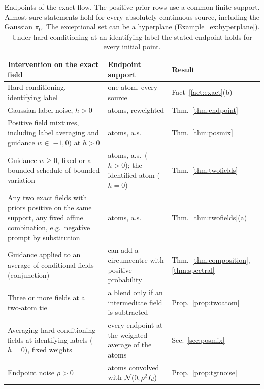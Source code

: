 \documentclass{article} %
\theoremstyle{plain}
\theoremstyle{definition}
\theoremstyle{remark}
\begin{document}
\begin{table}[t]
\centering\footnotesize
\begin{tabular}{@{}p{}p{}p{}@{}}
\toprule
Intervention on the exact field & Endpoint support & Result\\
\midrule
Hard conditioning, identifying label & one atom, every source & Fact~\ref{fact:exact}(b)\\
Gaussian label noise, $h>0$ & atoms, reweighted & Thm.~\ref{thm:endpoint}\\
Positive field mixtures, including label averaging and guidance $w\in[-1,0)$ at $h>0$ & atoms, a.s. & Thm.~\ref{thm:posmix}\\
Guidance $w\ge0$, fixed or a bounded schedule of bounded variation & atoms, a.s.\ ($h>0$); the identified atom ($h=0$) & Thm.~\ref{thm:twofields}\\
Any two exact fields with priors positive on the same support, any fixed affine combination, e.g.\ negative prompt by substitution & atoms, a.s. & Thm.~\ref{thm:twofields}(a)\\
Guidance applied to an average of conditional fields (conjunction) & can add a circumcentre with positive probability & Thm.~\ref{thm:composition}, \ref{thm:spectral}\\
Three or more fields at a two-atom tie & a blend only if an intermediate field is subtracted & Prop.~\ref{prop:twoatom}\\
Averaging hard-conditioning fields at identifying labels ($h=0$), fixed weights & every endpoint at the weighted average of the atoms & Sec.~\ref{sec:posmix}\\
Endpoint noise $\rho>0$ & atoms convolved with $\mathcal{N}(0,\rho^2I_d)$ & Prop.~\ref{prop:tgtnoise}\\
\bottomrule
\end{tabular}
\caption{Endpoints of the exact flow. The positive-prior rows use a common finite support.
Almost-sure statements hold for every absolutely continuous source, including the Gaussian $\pi_0$.
The exceptional set can be a hyperplane (Example~\ref{ex:hyperplane}).
Under hard conditioning at an identifying label the stated endpoint holds for every initial point.}
\label{tab:interventions}
\end{table}
\end{document}
